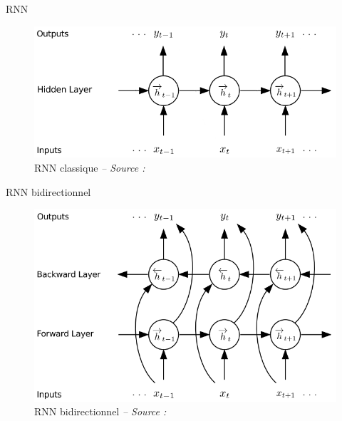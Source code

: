 \begin{frame}{RNN}
    
    \begin{figure}
        \includegraphics[height=.75\textheight,width=\textwidth,keepaspectratio]{images/arch_rnn}
        \caption{RNN classique {\scriptsize\it -- Source : \cite{Graves13b}}}
    \end{figure}
    
\end{frame}

\begin{frame}{RNN bidirectionnel}
    
    \begin{figure}
        \includegraphics[height=.75\textheight,width=\textwidth,keepaspectratio]{images/arch_brnn}
        \caption{RNN bidirectionnel {\scriptsize\it -- Source : \cite{Graves13b}}}
    \end{figure}
    
\end{frame}

